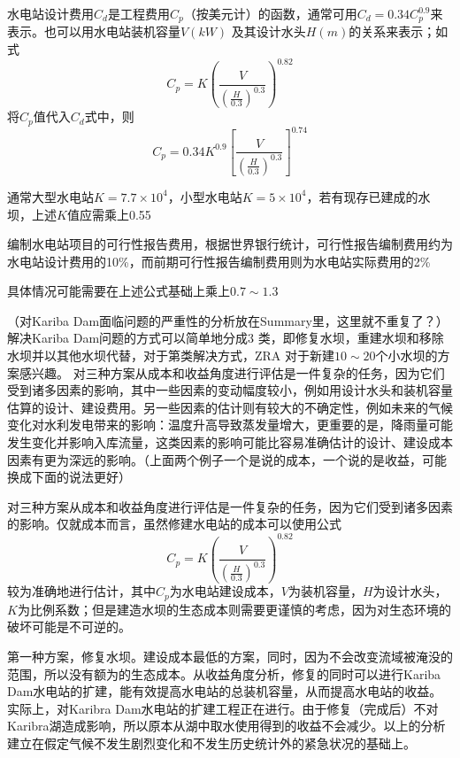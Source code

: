\documentclass{article}
\begin{document}
水电站设计费用$C_{d}$是工程费用$C_{p}$（按美元计）的函数，通常可用$C_{d} = 0.34C_{p}^{0.9}$来表示。也可以用水电站装机容量$V(kW)$ 及其设计水头$H(m)$的关系来表示；如式
\[C_{p} = K\left(\frac{V}{\left(\frac{H}{0.3}\right)^{0.3}}\right)^{0.82}\]
将$C_{p}$值代入$C_{d}$式中，则
\[C_{p} = 0.34K^{0.9}\left[\frac{V}{\left(\frac{H}{0.3}\right)^{0.3}}\right]^{0.74}\]

通常大型水电站$K = 7.7\times10^{4}$，小型水电站$K = 5 \times 10^{4}$，若有现存已建成的水坝，上述$K$值应需乘上0.55

编制水电站项目的可行性报告费用，根据世界银行统计，可行性报告编制费用约为水电站设计费用的10\%，而前期可行性报告编制费用则为水电站实际费用的2\%

具体情况可能需要在上述公式基础上乘上$0.7\sim1.3$


（对Kariba Dam面临问题的严重性的分析放在Summary里，这里就不重复了？）解决Kariba Dam问题的方式可以简单地分成3 类，即修复水坝，重建水坝和移除水坝并以其他水坝代替，对于第类解决方式，ZRA 对于新建$10\sim20$个小水坝的方案感兴趣。
对三种方案从成本和收益角度进行评估是一件复杂的任务，因为它们受到诸多因素的影响，其中一些因素的变动幅度较小，例如用设计水头和装机容量估算的设计、建设费用。另一些因素的估计则有较大的不确定性，例如未来的气候变化对水利发电带来的影响：温度升高导致蒸发量增大，更重要的是，降雨量可能发生变化并影响入库流量，这类因素的影响可能比容易准确估计的设计、建设成本因素有更为深远的影响。（上面两个例子一个是说的成本，一个说的是收益，可能换成下面的说法更好）

对三种方案从成本和收益角度进行评估是一件复杂的任务，因为它们受到诸多因素的影响。仅就成本而言，虽然修建水电站的成本可以使用公式
\[C_{p} = K\left(\frac{V}{\left(\frac{H}{0.3}\right)^{0.3}}\right)^{0.82}\]
较为准确地进行估计，其中$C_{p}$为水电站建设成本，$V$为装机容量，$H$为设计水头，$K$为比例系数；但是建造水坝的生态成本则需要更谨慎的考虑，因为对生态环境的破坏可能是不可逆的。

第一种方案，修复水坝。建设成本最低的方案，同时，因为不会改变流域被淹没的范围，所以没有额为的生态成本。从收益角度分析，修复的同时可以进行Kariba Dam水电站的扩建，能有效提高水电站的总装机容量，从而提高水电站的收益。实际上，对Karibra Dam水电站的扩建工程正在进行。由于修复（完成后）不对Karibra湖造成影响，所以原本从湖中取水使用得到的收益不会减少。以上的分析建立在假定气候不发生剧烈变化和不发生历史统计外的紧急状况的基础上。
\end{document}
